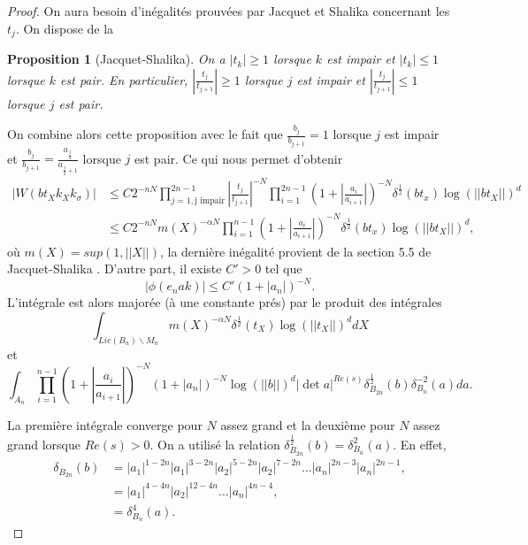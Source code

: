 \documentclass{amsart}
\newtheorem{proposition}{Proposition}[section]
\begin{document}
\begin{proof}
 On aura besoin d'inégalités prouvées par Jacquet et Shalika \cite{jacquet-shalika} concernant les $t_j$. On dispose de la
 \begin{proposition}[Jacquet-Shalika]
 On a $|t_k| \geq 1$ lorsque $k$ est impair et $|t_k| \leq 1$ lorsque $k$ est pair. En particulier, $|\frac{t_j}{t_{j+1}}| \geq 1$ lorsque $j$ est impair et $|\frac{t_j}{t_{j+1}}| \leq 1$ lorsque $j$ est pair.
 \end{proposition}
 
 On combine alors cette proposition avec le fait que $\frac{b_j}{b_{j+1}} = 1$ lorsque $j$ est impair et $\frac{b_j}{b_{j+1}} = \frac{a_\frac{j}{2}}{a_{\frac{j}{2}+1}}$ lorsque $j$ est pair. Ce qui nous permet d'obtenir
 \begin{align}
 |W(bt_Xk_Xk_\sigma)| &\leq C 2^{-nN} \prod_{j=1, \text{j impair}}^{2n-1} |\frac{t_j}{t_{j+1}}|^{-N} \prod_{i=1}^{2n-1} (1 + |\frac{a_i}{a_{i+1}}|)^{-N} \delta^{\frac{1}{2}}(bt_x)\log(||bt_X||)^d \\
 &\leq C 2^{-nN} m(X)^{-\alpha N} \prod_{i=1}^{n-1} (1 + |\frac{a_i}{a_{i+1}}|)^{-N} \delta^{\frac{1}{2}}(bt_x)\log(||bt_X||)^d,
 \end{align}
 où $m(X) = sup(1, ||X||)$, la dernière inégalité provient de la section 5.5 de Jacquet-Shalika \cite{jacquet-shalika}. D'autre part, il existe $C' > 0$ tel que
 \begin{equation}
 |\phi(e_nak)| \leq C'(1+|a_n|)^{-N}.
 \end{equation}
 L'intégrale est alors majorée (à une constante prés) par le produit des intégrales
 \begin{equation}
 \int_{Lie(B_n)\backslash{M_n}} m(X)^{-\alpha N} \delta^{\frac{1}{2}}(t_X)\log(||t_X||)^d dX
 \end{equation}
 et
 \begin{equation}
 \int_{A_n}  \prod_{i=1}^{n-1} (1+ |\frac{a_i}{a_{i+1}}|)^{-N} (1+|a_n|)^{-N}\log(||b||)^d|\det a|^{Re(s)} \delta_{B_{2n}}^{\frac{1}{2}}(b)\delta_{B_n}^{-2}(a) da.
 \end{equation}
 
 La première intégrale converge pour $N$ assez grand et la deuxième pour $N$ assez grand lorsque $Re(s) > 0$. On a utilisé la relation $\delta_{B_{2n}}^{\frac{1}{2}}(b) = \delta_{B_n}^2(a)$. En effet,
 \begin{align}
 \delta_{B_{2n}}(b) &= |a_1|^{1-2n}|a_1|^{3-2n}|a_2|^{5-2n}|a_2|^{7-2n}...|a_n|^{2n-3}|a_n|^{2n-1}, \\
 &= |a_1|^{4-4n}|a_2|^{12-4n}...|a_n|^{4n-4},\\
 &= \delta_{B_n}^4(a).
 \end{align}
  \end{proof}
  
\end{document}
